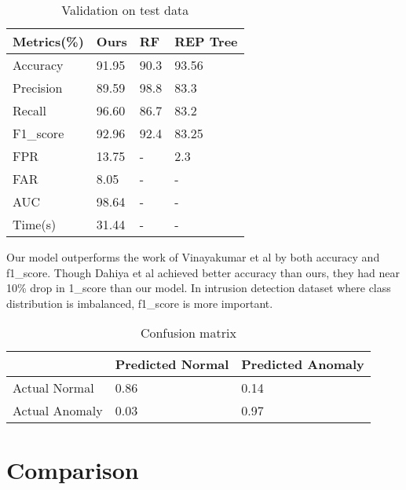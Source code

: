 \documentclass[14pt, conference]{IEEEtran}
\begin{document}
\begin{table}
\normalsize
\centering
\caption{Validation on test data}
\label{validationResult}
\renewcommand{\arraystretch}{1.2}
\begin{tabular}{|C{2cm}|C{1.2cm}|C{1.3cm}|C{1.7cm}|}
\hline
\textbf{Metrics(\%)} & \textbf{Ours} & \textbf{RF\cite{vinayakumar2019deep}} & \textbf{REP Tree\cite{dahiya2018network} }\\ \hline
Accuracy & 91.95 & 90.3 & 93.56 \\ \hline
Precision & 89.59 & 98.8 & 83.3\\ \hline
Recall  & 96.60 & 86.7 & 83.2 \\ \hline
F1\_score  & 92.96 & 92.4 & 83.25 \\ \hline
FPR & 13.75 & - & 2.3 \\ \hline
FAR & 8.05 & - &  - \\ \hline
AUC & 98.64 & - & - \\ \hline
Time(s) & 31.44 & - & - \\ \hline

\end{tabular}
\end{table}

Our model outperforms the work of Vinayakumar et al \cite{vinayakumar2019deep} by both accuracy and f1\_score.
Though Dahiya et al \cite{dahiya2018network} achieved better accuracy than ours, they had near 10\% drop in
1\_score than our model. In intrusion detection dataset where class distribution is imbalanced, f1\_score is more important.

\begin{table}
\normalsize
\centering
\caption{Confusion matrix}
\label{confusionMatrix}
\renewcommand{\arraystretch}{1.2}
\begin{tabular}{|C{2.2cm}|C{2.3cm}|C{2.3cm}|}
\hline
 & Predicted Normal & Predicted Anomaly \\ \hline
Actual Normal & 0.86 & 0.14 \\ \hline
Actual Anomaly & 0.03 & 0.97\\ \hline
\end{tabular}
\end{table}


\section{Comparison \label{comparison}}
\end{document}
